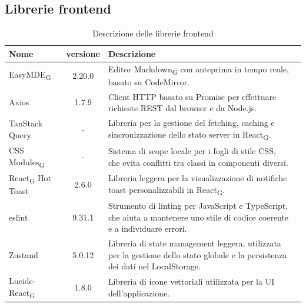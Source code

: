 \documentclass[11pt,a4paper]{article}
\newcommand{\gls}[1]{#1\textsubscript{G}}
\begin{document}
\subsection{Librerie frontend}
    \begin{table}[H]
        \centering
        \begin{tabular}{|l|c|>{\raggedright\arraybackslash}p{}|p{}|}
            \hline
            \textbf{Nome} & \textbf{versione} & \textbf{Descrizione} \\
            \hline
            \gls{EasyMDE} & 2.20.0 & Editor \gls{Markdown} con anteprima in tempo reale, basato su CodeMirror. \\
            \hline
            Axios & 1.7.9 & Client HTTP basato su Promise per effettuare richieste REST dal browser e da Node.js. \\
            \hline
            TanStack Query & - & Libreria per la gestione del fetching, caching e sincronizzazione dello stato server in \gls{React}. \\
            \hline
            \gls{CSS Modules} & - & Sistema di scope locale per i fogli di stile CSS, che evita conflitti tra classi in componenti diversi. \\
            \hline
            \gls{React} Hot Toast & 2.6.0 & Libreria leggera per la visualizzazione di notifiche toast personalizzabili in \gls{React}. \\
            \hline
            eslint & 9.31.1 & Strumento di linting per JavaScript e TypeScript, che aiuta a mantenere uno stile di codice coerente e a individuare errori. \\
            \hline
            Zustand & 5.0.12 & Libreria di state management leggera, utilizzata per la gestione dello stato globale e la persistenza dei dati nel LocalStorage.\\
            \hline
            Lucide-\gls{React} & 1.8.0 & Libreria di icone vettoriali utilizzata per la UI dell'applicazione.\\
            \hline
        \end{tabular}
        \caption{Descrizione delle librerie frontend}
        \label{tab:librerie_frontend}
    \end{table}
\end{document}
